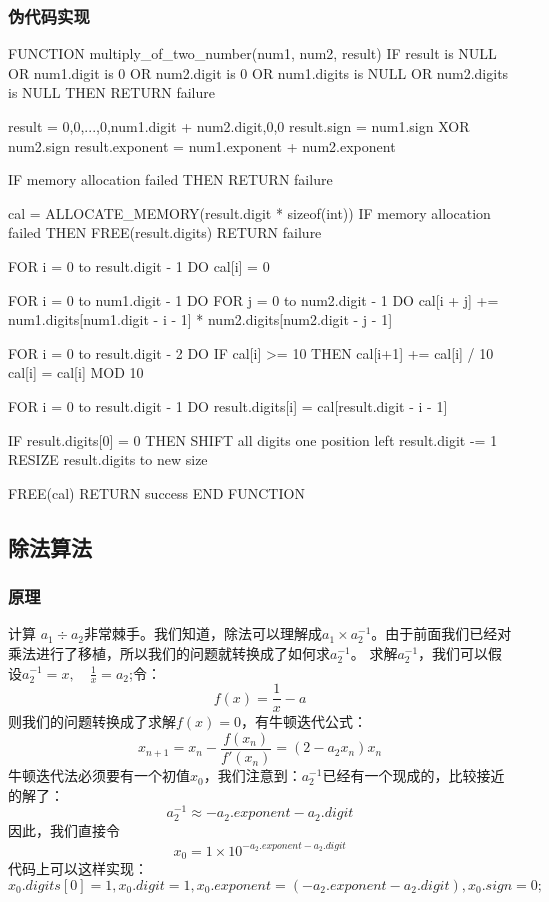 \documentclass[11pt]{article}
\begin{document}
\subsubsection{伪代码实现}
\begin{codeline}
    FUNCTION multiply_of_two_number(num1, num2, result)
    IF result is NULL OR num1.digit is 0 OR num2.digit is 0 OR
       num1.digits is NULL OR num2.digits is NULL THEN
        RETURN failure
    
    result = {{0,0,...,0},num1.digit + num2.digit,0,0}
    result.sign = num1.sign XOR num2.sign 
    result.exponent = num1.exponent + num2.exponent
   
    IF memory allocation failed THEN
        RETURN failure

    cal = ALLOCATE_MEMORY(result.digit * sizeof(int))
    IF memory allocation failed THEN
        FREE(result.digits)
        RETURN failure
    
    FOR i = 0 to result.digit - 1 DO
        cal[i] = 0
    
    FOR i = 0 to num1.digit - 1 DO
        FOR j = 0 to num2.digit - 1 DO
            cal[i + j] += num1.digits[num1.digit - i - 1] * 
                          num2.digits[num2.digit - j - 1]
    
    FOR i = 0 to result.digit - 2 DO
        IF cal[i] >= 10 THEN
            cal[i+1] += cal[i] / 10
            cal[i] = cal[i] MOD 10
    
    FOR i = 0 to result.digit - 1 DO
        result.digits[i] = cal[result.digit - i - 1]
    
    IF result.digits[0] = 0 THEN
        SHIFT all digits one position left
        result.digit -= 1
        RESIZE result.digits to new size
    
    FREE(cal)
    RETURN success
END FUNCTION
\end{codeline}


\subsection{除法算法}
\subsubsection{原理}
计算 $a_1\div a_2$非常棘手。我们知道，除法可以理解成$a_1 \times a_2^{-1}$。由于前面我们已经对乘法进行了移植，所以我们的问题就转换成了如何求$a_2^{-1}$。
求解$a_2^{-1}$，我们可以假设$a_2^{-1}=x,\quad \frac{1}{x}=a_2$;令：
$$
f(x) = \frac{1}{x} - a
$$
则我们的问题转换成了求解$f(x) = 0$，有牛顿迭代公式：
$$
x_{n+1} =x_n - \frac{f(x_n)}{f'(x_n)}= (2 - a_2 x_n) x_n
$$
牛顿迭代法必须要有一个初值$x_0$，我们注意到：$a_2^{-1}$已经有一个现成的，比较接近的解了：
$$a_2^{-1} \approx -a_2.exponent - a_2.digit $$
因此，我们直接令
$$x_0 = 1 \times 10^{-a_2.exponent - a_2.digit}$$
代码上可以这样实现：
$$x_0.digits [0] =1,x_0.digit=1,x_0.exponent= (-a_2.exponent - a_2.digit),x_0.sign = 0;$$
\end{document}
